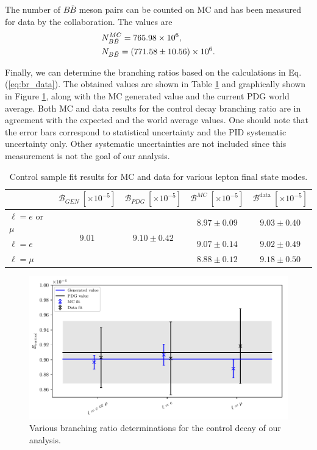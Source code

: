 The number of $B\bar B$ meson pairs can be counted on MC and has been measured for data by the collaboration. The values are
\begin{align*}
&N_{B\bar B}^{MC} = 765.98\times 10^{6},\\
&N_{B\bar B} = (771.58 \pm 10.56)\times 10^{6}.
\end{align*}

Finally, we can determine the branching ratios based on the calculations in Eq. (\ref{eq:br_data}). The obtained values are shown in Table \ref{tab:br_result} and graphically shown in Figure \ref{fig:br_plot}, along with the MC generated value and the current PDG world average. Both MC and data results for the control decay branching ratio are in agreement with the expected and the world average values. One should note that the error bars correspond to statistical uncertainty and the PID systematic uncertainty only. Other systematic uncertainties are not included since this measurement is not the goal of our analysis.

\begin{table}[H]
	\centering
	\begin{tabular}{l|c|c|c|c}
		& $\mathcal{B}_{GEN}~[\times 10^{-5}]$ & $\mathcal{B}_{PDG}~[\times 10^{-5}]$ & $\mathcal{B}^{MC}~[\times 10^{-5}]$ & $\mathcal{B}^{\mathrm{data}}~[\times 10^{-5}]$ \\
		\toprule
		$\ell = e$ or $\mu$ & \multirow{3}{*}{$9.01$} & \multirow{3}{*}{$9.10\pm0.42$} & $8.97\pm0.09$ & $9.03\pm0.40$\\
		$\ell = e$ & & & $9.07\pm0.14$ & $9.02\pm0.49$ \\
		$\ell = \mu$  & & & $8.88\pm0.12$ & $9.18\pm0.50$\\
		\bottomrule
	\end{tabular}
	\captionsetup{width=.8\linewidth}
	\caption{Control sample fit results for MC and data for various lepton final state modes.}
	\label{tab:br_result}
\end{table}

\begin{figure}[H]
	\centering
	\captionsetup{width=0.8\linewidth}
	\includegraphics[width=\linewidth]{fig/br_plot}
	\caption{Various branching ratio determinations for the control decay of our analysis.}
	\label{fig:br_plot}
\end{figure}

